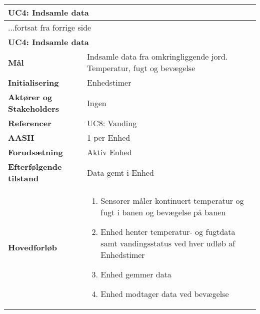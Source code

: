 \begin{center} \centering \label{UC4}
	\begin{longtable}{|p{5cm}|p{9cm}|}  %
	\hline
		\multicolumn{2}{|l|}{\textbf{UC4: Indsamle data}} \\\hline %
		\endfirsthead
		
		\multicolumn{2}{l}{...fortsat fra forrige side} \\ \hline %
		\multicolumn{2}{|l|}{\textbf{UC4: Indsamle data}} \\\hline %
		\endhead	
		
		\textbf{Mål}								&Indsamle data fra omkringliggende jord. Temperatur, fugt og bevægelse			\\\hline
		\textbf{Initialisering}					&Enhedstimer			\\\hline
		\textbf{Aktører og Stakeholders}			&Ingen				\\\hline
		\textbf{Referencer}						&UC8: Vanding		\\\hline
		\textbf{AASH}							&1 per Enhed			\\\hline
		\textbf{Forudsætning}					&Aktiv Enhed			\\\hline
		\textbf{Efterfølgende tilstand}			&Data gemt i Enhed 	\\\hline
		\textbf{Hovedforløb}					
			&\begin{enumerate}
	
				\item Sensorer måler kontinuert temperatur og fugt i banen og bevægelse på banen
				
				\item Enhed henter temperatur- og fugtdata samt vandingsstatus ved hver udløb af Enhedstimer
				
				\item Enhed gemmer data				
				
				\item Enhed modtager data ved bevægelse  
				
			\end{enumerate}\\\hline
	\end{longtable}
\end{center}

